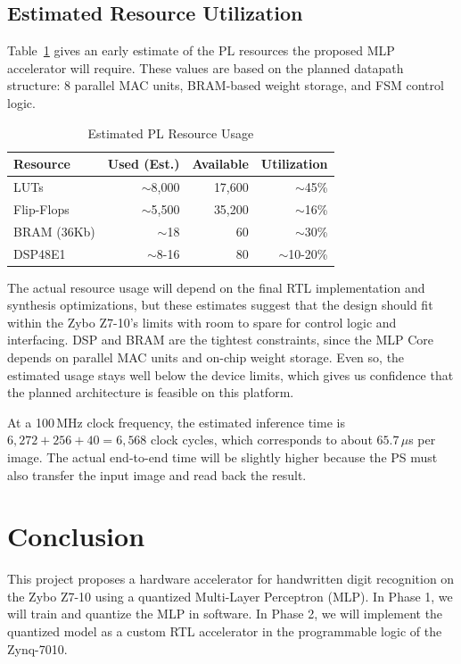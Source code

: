 \documentclass[12pt, letterpaper]{article}
\begin{document}
\subsection{Estimated Resource Utilization}

Table~\ref{tab:resource_est} gives an early estimate of the PL resources the proposed MLP accelerator will require. These values are based on the planned datapath structure: 8 parallel MAC
units, BRAM-based weight storage, and FSM control logic.
\begin{table}[H]
\centering
\caption{Estimated PL Resource Usage}
\label{tab:resource_est}
\begin{tabular}{lrrr}
\toprule
\textbf{Resource} & \textbf{Used (Est.)} & \textbf{Available} & \textbf{Utilization} \\
\midrule
LUTs        & $\sim$8,000 & 17,600 & $\sim$45\% \\
Flip-Flops  & $\sim$5,500 & 35,200 & $\sim$16\% \\
BRAM (36Kb) & $\sim$18    & 60     & $\sim$30\% \\
DSP48E1     & $\sim$8-16    & 80     & $\sim$10-20\% \\
\bottomrule
\end{tabular}
\end{table}

The actual resource usage will depend on the final RTL implementation and synthesis optimizations, but these estimates
suggest that the design should fit within the Zybo Z7-10's limits with room to spare for control logic and interfacing.
DSP and BRAM are the tightest constraints, since the MLP Core depends on parallel MAC units and on-chip weight storage.
Even so, the estimated usage stays well below the device limits, which gives us confidence that the planned architecture
is feasible on this platform.

At a 100\,MHz clock frequency, the estimated inference time is $6{,}272 + 256 + 40 = 6{,}568$ clock cycles, which corresponds
to about $65.7\,\mu$s per image. The actual end-to-end time will be slightly higher because the PS must also transfer the input
image and read back the result.

\section{Conclusion}

This project proposes a hardware accelerator for handwritten digit recognition on the Zybo Z7-10 using a quantized Multi-Layer
Perceptron (MLP). In Phase 1, we will train and quantize the MLP in software. In Phase 2, we will implement the quantized model
as a custom RTL accelerator in the programmable logic of the Zynq-7010.
\end{document}
